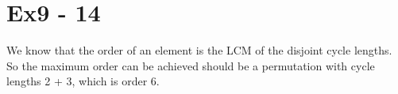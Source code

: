 \section*{Ex9 - 14}
We know that the order of an element is the LCM of the disjoint cycle lengths. So the maximum order can be achieved should be a permutation with cycle lengths 2 + 3, which is order 6.